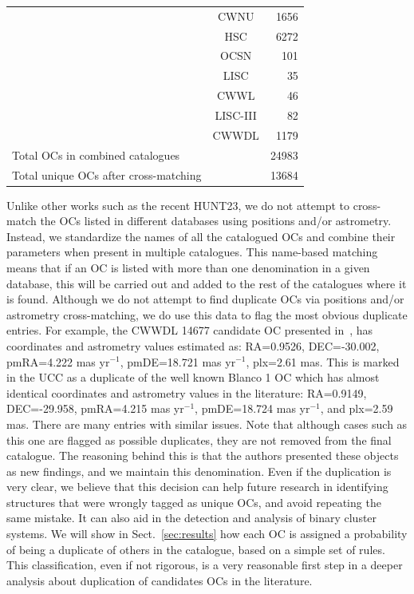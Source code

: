 \documentclass[fleqn,usenatbib]{mnras}
\begin{document}
\begin{table}
\begin{tabular}{lcr}
		\cite{He_2023}  & CWNU   & 1656\\
		\citet[][HUNT23]{Hunt_2023}   & HSC  & 6272\\
		\cite{Qin_2023}  & OCSN    & 101\\
		\cite{Li_2023}  & LISC  & 35\\
		\cite{Chi_2023_2} & CWWL  & 46\\
		\cite{Chi_2023}  & LISC-III    & 82\\
		\cite{Chi_2023_3}  & CWWDL  & 1179\\
		\hline
		Total OCs in combined catalogues    &   & 24983\\
		Total unique OCs after cross-matching  &  & 13684\\
		\hline
	\end{tabular}
\end{table}

Unlike other works such as the recent HUNT23, we do not attempt to cross-match
the OCs listed in different databases using positions and/or astrometry.
Instead, we standardize the names of all the catalogued OCs and combine their
parameters when present in multiple catalogues.
This name-based matching means that if an OC is listed with more than one
denomination in a given database, this will be carried out and added to the
rest of the catalogues where it is found. Although we do not attempt to find
duplicate OCs via positions and/or astrometry cross-matching, we do use this
data to flag the most obvious duplicate entries. For example, the CWWDL 14677
candidate OC presented in~\cite{Chi_2023_3}, has coordinates and astrometry
values estimated as: RA=0.9526\textdegree, DEC=-30.002\textdegree, pmRA=4.222 
mas yr$^{-1}$, pmDE=18.721 mas yr$^{-1}$, plx=2.61 mas. This is marked in the
UCC as a duplicate of the well known Blanco 1 OC which has almost identical
coordinates and astrometry values in the literature: RA=0.9149\textdegree,
DEC=-29.958\textdegree, pmRA=4.215 mas yr$^{-1}$, pmDE=18.724 mas yr$^{-1}$, and 
plx=2.59 mas. There are many entries with similar issues. Note that although
cases such as this one are flagged as possible duplicates, they are not
removed from the final catalogue. The reasoning behind this is that the authors
presented these objects as new findings, and we maintain this denomination. Even
if the duplication is very clear, we believe that this decision can help
future research in identifying structures that were wrongly tagged as
unique OCs, and avoid repeating the same mistake. It can also aid in the
detection and analysis of binary cluster systems.
We will show in Sect.~\ref{sec:results} how each OC is assigned a probability of
being a duplicate of others in the catalogue, based on a simple set of rules.
This classification, even if not rigorous, is a very reasonable first step in a
deeper analysis about duplication of candidates OCs in the literature.
\end{document}

